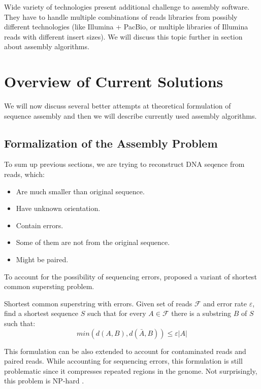 Wide variety of technologies present additional challenge to assembly software.
They have to handle multiple combinations of reads libraries from possibly
different technologies (like Illumina + PacBio,
or multiple libraries of Illumina reads with different insert sizes).
We will discuss this topic further in section about assembly algorithms. 

\section{Overview of Current Solutions}

We will now discuss several better attempts at theoretical
formulation of sequence assembly and then we will describe currently
used assembly algorithms.

\subsection{Formalization of the Assembly Problem}

To sum up previous sections, we are trying to reconstruct DNA seqence from reads,
which:
\begin{itemize}
\itemsep-0pt
\item Are much smaller than original sequence.
\item Have unknown orientation.
\item Contain errors.
\item Some of them are not from the original sequence.
\item Might be paired. 
\end{itemize}

\bigskip

To account for the possibility of sequencing errors, 
\citet{kececioglu1995combinatorial}
proposed a variant of shortest common supersting problem. 

\begin{definition}{Shortest common superstring with errors.}
Given set of reads $\mathcal{F}$ and error rate $\varepsilon$, find
a shortest sequence $S$ such that for every $A \in \mathcal{F}$ there is a substring
$B$ of $S$ such that:
$$min(d(A,B), d(\bar{A}, B)) \leq \varepsilon |A|$$
\end{definition}

This formulation can be also extended to account for contaminated reads and paired reads.
While accounting for sequencing errors, this formulation is still problematic
since it compresses repeated regions in the genome.
Not surprisingly, this problem is NP-hard \citep{kececioglu1991exact}.

